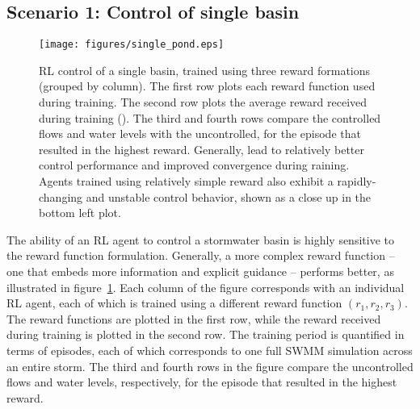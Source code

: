 \subsection{\textbf{Scenario 1: Control of single basin}}

\begin{figure}[H]
    \centering
    \texttt{[image: figures/single\_pond.eps]}
    \caption{RL control of a single basin, trained using three reward formations (grouped by column). The first row plots each reward function used during training. The second row plots the average reward received during training (). The third and fourth rows compare the controlled flows and water levels with the uncontrolled, for the episode that resulted in the highest reward. Generally,   lead to relatively better control performance and improved convergence during raining. Agents trained using relatively simple reward also exhibit a rapidly-changing and unstable control behavior, shown as a close up in the bottom left plot.}
    \label{fig:3}
\end{figure}



The ability of an RL agent to control a stormwater basin is highly sensitive to the reward function formulation.
Generally, a more complex reward function -- one that embeds more information and explicit guidance -- performs better, as illustrated in figure~\ref{fig:3}.
Each column of the figure corresponds with an individual RL agent, each of which is trained using a different reward function $(r_1,r_2,r_3)$.
The reward functions are plotted in the first row, while the reward received during training is plotted in the second row.
The training period is quantified in terms of episodes, each of which corresponds to one full SWMM simulation across an entire storm.
The third and fourth rows in the figure compare the uncontrolled flows and water levels, respectively, for the episode that resulted in the highest reward.

